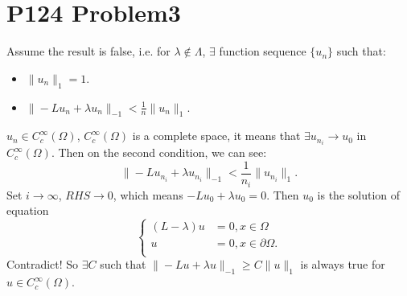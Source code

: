 \documentclass[a4paper]{ctexart}
\begin{document}
\section*{P124 Problem3}
Assume the result is false, i.e. for $\lambda\notin\Lambda $, $\exists$ function sequence $\{u_{n}\}$ such that:
\begin{itemize}
    \item $\|u_{n}\|_{1}=1$.
    \item $\|-Lu_{n}+\lambda u_{n}\|_{-1}<\frac{1}{n}\|u_{n}\|_{1}$.
\end{itemize}
$u_{n}\in C_{c}^{\infty}(\Omega)$, $C_{c}^{\infty}(\Omega)$ is a complete space, it means that $\exists u_{n_{i}}\rightarrow u_{0}$ in $C_{c}^{\infty}(\Omega)$. Then on the second condition, we can see:
\begin{equation}
\|-Lu_{n_{i}}+\lambda u_{n_{i}}\|_{-1}<\frac{1}{n_{i}}\|u_{n_{i}}\|_{1}.
\end{equation}
Set $i\rightarrow\infty$, $RHS\rightarrow 0$, which means $-Lu_{0}+\lambda u_{0}=0$. Then $u_{0}$ is the solution of equation
\begin{equation}
    \left\{
        \begin{aligned}
            (L-\lambda)u&=0,x\in\Omega\\
            u&=0,x\in\partial\Omega.\\
        \end{aligned}
    \right.
\end{equation}
Contradict! So $\exists C$ such that $\|-Lu+\lambda u\|_{-1}\ge C\|u\|_{1}$ is always true for $u\in C_{c}^{\infty}(\Omega)$.
\end{document}
